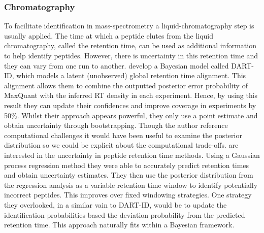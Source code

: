 \documentclass[12pt,english, journal=jpr, layout=twocolumn]{article}
\begin{document}
\subsubsection{Chromatography}
To facilitate identification in mass-spectrometry a liquid-chromatography step is usually applied. The time at which a peptide elutes from the liquid chromatography, called the retention time, can be used as additional information to help identify peptides. However, there is uncertainty in this retention time and they can vary from one run to another. \citet{Chen::2019} develop a Bayesian model called DART-ID, which models a latent (unobserved) global retention time alignment. This alignment allows them to combine the outputted posterior error probability of MaxQuant with the inferred RT density in each experiment. Hence, by using this result they can update their confidences and improve coverage in experiments by 50$\%$. Whilst their approach appears powerful, they only use a point estimate and obtain uncertainty through bootstrapping. Though the author reference computational challenges it would have been useful to examine the posterior distribution so we could be explicit about the computational trade-offs. \citet{Maboudi::2017} are interested in the uncertainty in peptide retention time methods. Using a Gaussian process regression method they were able to accurately predict retention times and obtain uncertainty estimates. They then use the posterior distribution from the regression analysis as a variable retention time window to identify potentially incorrect peptides. This improves over fixed windowing strategies. One strategy they overlooked, in a similar vain to DART-ID, would be to update the identification probabilities based the deviation probability from the predicted retention time. This approach naturally fits within a Bayesian framework. 
\end{document}
